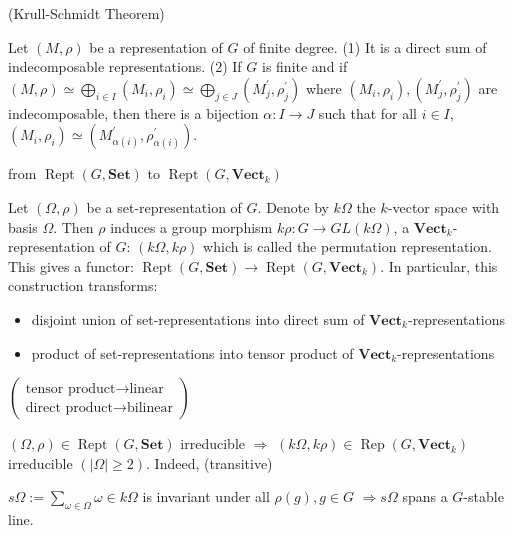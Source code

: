\documentclass[11pt, a4paper]{report}
\begin{document}
\begin{theorem}
(Krull-Schmidt Theorem)

Let $(M, \rho)$ be a representation of $G$ of finite degree.
(1) It is a direct sum of indecomposable representations.
(2) If $G$ is finite and if $(M, \rho) \simeq \bigoplus_{i \in I}\left(M_{i}, \rho_{i}\right) \simeq \bigoplus_{j \in J}\left(M_{j}^{\prime}, \rho_{j}^{\prime}\right)$ where $\left(M_{i}, \rho_{i}\right),\left(M_{j}^{\prime}, \rho_{j}^{\prime}\right)$ are indecomposable, then there is a bijection $\alpha: I \to J$ such that for all $i \in I$, $\left(M_{i}, \rho_{i}\right) \simeq\left(M_{\alpha(i)}^{\prime}, \rho_{\alpha(i)}^{\prime}\right)$.

\end{theorem}

\begin{definition}
from $\operatorname{Rept}(G, \mathbf{Set})$ to $\operatorname{Rept}(G, \mathbf{Vect}_k)$

Let $(\Omega, \rho)$ be a set-representation of $G$.
Denote by $k \Omega$ the $k$-vector space with basis $\Omega$.
Then $\rho$ induces a group morphism $k \rho: G \rightarrow GL(k \Omega)$, a $\mathbf{Vect}_k$-representation of $G$: $(k \Omega, k \rho)$ which is called the permutation representation. This gives a functor: $\operatorname{Rept}(G, \mathbf{Set}) \rightarrow \operatorname{Rept}(G, \mathbf{Vect}_k)$.
In particular, this construction transforms:
\begin{itemize}
\item disjoint union of set-representations into direct sum of $\mathbf{Vect}_k$-representations
\item product of set-representations into tensor product of $\mathbf{Vect}_k$-representations
\end{itemize}
$\begin{pmatrix} \text{tensor product} \rightarrow \text{linear} \\ \text{direct product} \rightarrow \text{bilinear} \end{pmatrix}$

\end{definition}

\begin{remark}
$(\Omega, \rho) \in \operatorname{Rept}(G, \mathbf{Set})$ irreducible $\Rightarrow$ $(k \Omega, k \rho) \in \operatorname{Rep}(G, \mathbf{Vect}_k)$ irreducible $(|\Omega| \geqslant 2)$. Indeed, (transitive)

$s \Omega:=\sum_{\omega \in \Omega} \omega \in k \Omega$ is invariant under all $\rho(g), g \in G$
$\Rightarrow s \Omega$ spans a $G$-stable line.

\end{remark}
\end{document}
